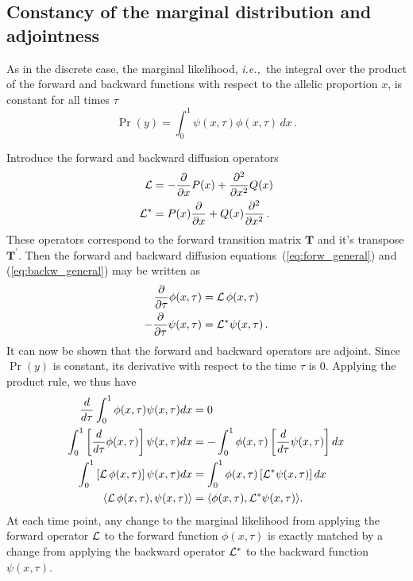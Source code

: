 \documentclass[preprint]{elsarticle}
\newcommand\ie{{\it i.e.,}}
\begin{document}
\subsection{Constancy of the marginal distribution and adjointness}

As in the discrete case, the marginal likelihood, \ie\ the integral over the product of the forward and backward functions with respect to the allelic proportion $x$, is constant for all times $\tau$
\begin{equation}\label{eq:marg_like}
\Pr(y) = \int_{0}^{1} \psi(x,\tau) \phi(x,\tau) \,dx\,.
\end{equation}

Introduce the forward and backward diffusion operators 
\begin{equation}
\begin{split}
    {\cal L}&=-\frac{\partial}{\partial x}P(x)+ \frac{\partial^2}{\partial x^2}Q(x)\\
    {\cal L}^{*}&=P(x)\frac{\partial}{\partial x} +Q(x)\frac{\partial^2}{\partial x^2}\,.
\end{split}
\end{equation}
These operators correspond to the forward transition matrix $\mathbf{T}$ and it's transpose $\mathbf{T}^{'}$. Then the forward and backward diffusion equations~(\ref{eq:forw_general}) and (\ref{eq:backw_general}) may be written as
\begin{equation}
\begin{split}
    \frac{\partial}{\partial \tau}\phi(x,\tau)&={\cal L}\,\phi(x,\tau)\\
    -\frac{\partial}{\partial \tau}\psi(x,\tau)&={\cal L}^{*}\psi(x,\tau)\,.
\end{split}
\end{equation}
It can now be shown that the forward and backward operators are adjoint. Since $\Pr(y)$ is constant, its derivative with respect to the time $\tau$ is $0$. Applying the product rule, we thus have
\begin{equation}\label{eq:adjoint_continuous}
\begin{split}
\frac{d}{d\tau}\int_{0}^{1} \phi(x,\tau) \psi(x,\tau)dx &= 0\\
\int_{0}^{1} \left[\frac{d}{d\tau} \phi(x,\tau)\right] \psi(x,\tau)dx &= -\int_{0}^{1} \phi(x,\tau) \left[\frac{d}{d\tau} \psi(x,\tau)\right] dx\\
\int_{0}^{1} \left[{\cal L}\,\phi(x,\tau)\right] \psi(x,\tau)dx &= \int_{0}^{1}  \phi(x,\tau) \left[{\cal L}^{*} \psi(x,\tau)\right] dx\\
\langle{\cal L}\,\phi(x,\tau), \psi(x,\tau)\rangle &= \langle \phi(x,\tau),{\cal L}^{*} \psi(x,\tau)\rangle.
\end{split}
\end{equation}
At each time point, any change to the marginal likelihood from applying the forward operator ${\cal L}$ to the forward function $\phi(x,\tau)$ is exactly matched by a change from applying the backward operator ${\cal L}^{*}$ to the backward function $\psi(x,\tau)$. 
\end{document}
